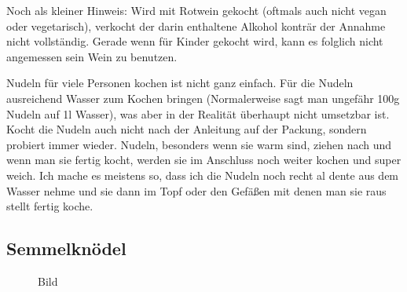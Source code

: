 \begin{tcolorbox}
    Noch als kleiner Hinweis: Wird mit Rotwein gekocht (oftmals auch nicht vegan oder vegetarisch), verkocht der darin enthaltene Alkohol konträr der Annahme nicht vollständig.
    Gerade wenn für Kinder gekocht wird, kann es folglich nicht angemessen sein Wein zu benutzen.

    Nudeln für viele Personen kochen ist nicht ganz einfach.
    Für die Nudeln ausreichend Wasser zum Kochen bringen (Normalerweise sagt man ungefähr 100g Nudeln auf 1l Wasser), was aber in der Realität überhaupt nicht umsetzbar ist.
    Kocht die Nudeln auch nicht nach der Anleitung auf der Packung, sondern probiert immer wieder.
    Nudeln, besonders wenn sie warm sind, ziehen nach und wenn man sie  \glqq fertig \grqq{} kocht, werden sie im Anschluss noch weiter kochen und super weich.
    Ich mache es meistens so, dass ich die Nudeln noch recht al dente aus dem Wasser nehme und sie dann im Topf oder den Gefäßen mit denen man sie raus stellt fertig koche.
\end{tcolorbox}
\newpage

\subsection{Semmelknödel}\label{subsec:semmelknodel}
\begin{tcolorbox}
    [
    blanker,
    width=0.64\textwidth,enlarge left by=0.36\textwidth,
    before skip=6pt,
    breakable,
    overlay unbroken and first={%
        \node[inner sep=0pt,outer sep=0pt,text width=0.33\textwidth,
            align=none,
            below right]
        at ([xshift=-0.36\textwidth]frame.north west)
            {%
            Rezept von Jakob\\
            Rezept für 10\\
            \begin{flushright}
                \noindent\makebox[\linewidth]{\rule{\linewidth}{0.4pt}}
                \textbf{Sub Zutat}\\
                Menge Zutat
            \end{flushright}
        };}]
    \begin{figure}[H]
        \begin{center}
            \caption{Bild}
        \end{center}
    \end{figure}

\end{tcolorbox}
\newpage

